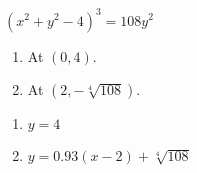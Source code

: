 {$(x^2+y^2-4)^3 = 108y^2$
\begin{enumerate}
\item	At $(0,4)$.
\item	At $(2,-\sqrt[4]{108})$.
\end{enumerate}
}
{\begin{enumerate}
\item	$y=4$
\item	$y = 0.93(x-2)+\sqrt[4]{108}$
\end{enumerate}
}
